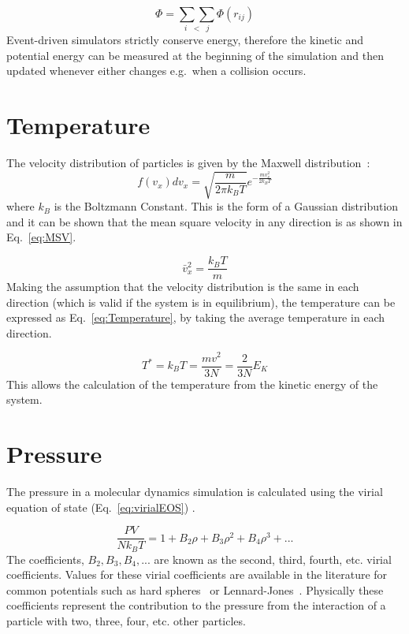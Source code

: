\documentclass[12pt]{UoAthesis} \usepackage{booktabs}
\begin{document}
\begin{equation}
  \label{eq:totalU}
  \Phi = \underset{i\;\;<\;\;j}{\sum\sum}\Phi(r_{ij})
\end{equation}
Event-driven simulators strictly conserve energy, therefore the
kinetic and potential energy can be measured at the beginning of the
simulation and then updated whenever either changes e.g.\ when a
collision occurs.

\section{Temperature}

The velocity distribution of particles is given by the Maxwell
distribution~\cite{Haile1997}:
\begin{equation}
  \label{eq:MaxwellDist}
  f(v_x)dv_x = \sqrt{\frac{m}{2\pi k_BT}}e^{-\frac{mv_x^2}{2k_BT}} 
\end{equation}
where $k_B$ is the Boltzmann Constant.
This is the form of a Gaussian distribution and it can be shown
\cite{Landau1968} that the mean square velocity in any direction is as
shown in Eq.~\eqref{eq:MSV}.

\begin{equation}
  \label{eq:MSV}
  \bar{v}_x^2 = \frac{k_BT}{m}
\end{equation}
Making the assumption that the velocity distribution is the same in
each direction (which is valid if the system is in equilibrium), the
temperature can be expressed as Eq.~\eqref{eq:Temperature}, by taking
the average temperature in each direction.

\begin{equation}
\label{eq:Temperature}
  T^* = k_BT = \frac{mv^2}{3N} = \frac{2}{3N}E_K
\end{equation}
This allows the calculation of the temperature from the kinetic energy
of the system.
\section{Pressure \label{sec:Pressure}}

The pressure in a molecular dynamics simulation is calculated using
the virial equation of state (Eq.~\eqref{eq:virialEOS})
\cite{Landau1968}.

\begin{equation}
  \label{eq:virialEOS}
  \frac{PV}{Nk_BT} = 1 + B_2\rho + B_3\rho^2 + B_4\rho^3 + ...
\end{equation}
The coefficients, $B_2, B_3, B_4, ...$ are known as the second, third,
fourth, etc. virial coefficients.  Values for these virial
coefficients are available in the literature for common potentials
such as hard spheres~\cite{Labik2005} or
Lennard-Jones~\cite{Schultz2009}. Physically these coefficients
represent the contribution to the pressure from the interaction of a
particle with two, three, four, etc. other particles.
\end{document}
